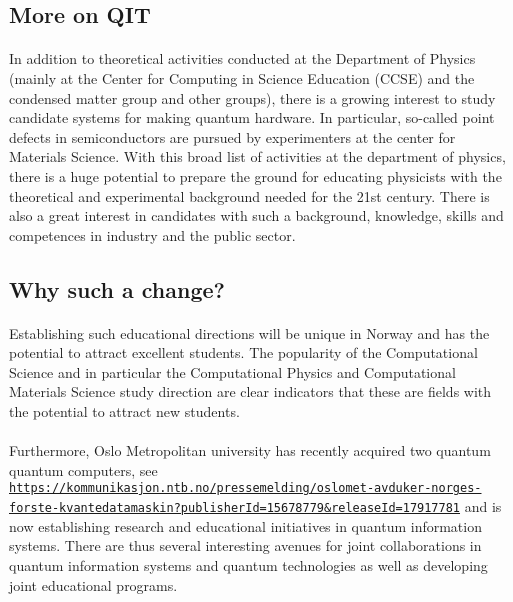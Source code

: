 \documentclass[%
oneside,                 %
final,                   %
10pt]{article}
\begin{document}
\subsection{More on QIT}


\paragraph{}
In addition to theoretical activities conducted at the
Department of Physics (mainly at the Center for Computing in Science
Education (CCSE) and the condensed matter group and other groups), there is a growing
interest to study candidate systems for making quantum hardware. In
particular, so-called point defects in semiconductors are pursued by
experimenters at the center for Materials Science.  With this broad
list of activities at the department of physics, there is a huge
potential to prepare the ground for educating physicists with the
theoretical and experimental background needed for the 21st
century. There is also a great interest in candidates with such a
background, knowledge, skills and competences in industry and the
public sector.



\subsection{Why such a change?}


\paragraph{}
Establishing such educational directions will be
unique in Norway and has the potential to attract excellent students.
The popularity of the Computational Science and in particular the Computational Physics and Computational Materials Science study direction are clear indicators that these are fields with the potential to attract new students.




\paragraph{}
Furthermore,
Oslo Metropolitan university  has recently acquired two quantum quantum computers, see \href{{https://kommunikasjon.ntb.no/pressemelding/oslomet-avduker-norges-forste-kvantedatamaskin?publisherId=15678779&releaseId=17917781}}{\nolinkurl{https://kommunikasjon.ntb.no/pressemelding/oslomet-avduker-norges-forste-kvantedatamaskin?publisherId=15678779&releaseId=17917781}} and is now establishing research and educational initiatives in quantum information systems. There are thus several interesting avenues for joint collaborations in quantum information systems and quantum technologies as well as developing joint educational programs.
\end{document}
